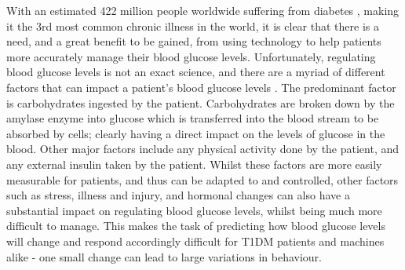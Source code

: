     With an estimated 422 million people worldwide suffering from diabetes \cite{world_2019}, making it the 3rd most common chronic illness in the world, it is clear that there is a need, and a great benefit to be gained, from using technology to help patients more accurately manage their blood glucose levels. Unfortunately, regulating blood glucose levels is not an exact science, and there are a myriad of different factors that can impact a patient's blood glucose levels \cite{bglfactors}. The predominant factor is carbohydrates ingested by the patient. Carbohydrates are broken down by the amylase enzyme into glucose which is transferred into the blood stream to be absorbed by cells; clearly having a direct impact on the levels of glucose in the blood. Other major factors include any physical activity done by the patient, and any external insulin taken by the patient. Whilst these factors are more easily measurable for patients, and thus can be adapted to and controlled, other factors such as stress, illness and injury, and hormonal changes can also have a substantial impact on regulating blood glucose levels, whilst being much more difficult to manage. This makes the task of predicting how blood glucose levels will change and respond accordingly difficult for T1DM patients and machines alike - one small change can lead to large variations in behaviour.  

